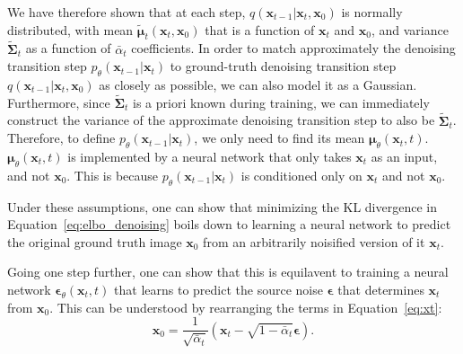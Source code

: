 \documentclass[11pt,addpoints,answers]{exam}
\newcommand{\xv}{\mathbf{x}}
\newcommand{\zv}{\mathbf{z}}
\newcommand{\epsilonv   }{\boldsymbol \epsilon   }
\newcommand{\muv        }{\boldsymbol \mu        }
\begin{document}
\begin{questions}
    We have therefore shown that at each step, 
 $q(\xv_{t-1} | \xv_t, \xv_0)$ is normally distributed, with mean $\tilde{\muv}_t(\xv_t, \xv_0)$
 that is a function of $\xv_t$ and $\xv_0$, and variance $\tilde{\boldsymbol{\Sigma}}_t$ as a function of $\bar\alpha_{t}$ coefficients. In order to match approximately the denoising transition step $p_\theta(\xv_{t-1}|\xv_t)$
 to ground-truth denoising transition step $q(\xv_{t-1} | \xv_t, \xv_0)$
 as closely as possible, we can also model it as a Gaussian. Furthermore, since $\tilde{\boldsymbol{\Sigma}}_t$ is a priori known during training, we can immediately construct the variance of the approximate denoising transition step to also be 
$\tilde{\boldsymbol{\Sigma}}_t$. Therefore, to define $p_\theta(\xv_{t-1}|\xv_t)$, we only need to find its mean $\boldsymbol{\mu}_\theta(\xv_t, t)$. $\boldsymbol{\mu}_\theta(\xv_t, t)$ is implemented by a neural network that only takes $\xv_t$ as an input, and not $\xv_0$. This is because $p_\theta(\xv_{t-1}|\xv_t)$ is conditioned only on $\xv_t$ and not $\xv_0$.
    \par
Under these assumptions, one can show that minimizing the KL divergence in Equation~\ref{eq:elbo_denoising} boils down to learning a neural network to predict the original ground truth image $\xv_0$ from an arbitrarily noisified version of it $\xv_t$. 

Going one step further, one can show that this is equilavent to training a neural network $\boldsymbol{\epsilon}_\theta(\xv_t,t)$ that learns to predict the source noise $\boldsymbol{\epsilon}$
 that determines $\xv_t$
 from $\xv_0$. This can be understood by rearranging the terms in Equation~\ref{eq:xt}: 
\begin{equation}
        \xv_0 = \frac{1}{\sqrt{\bar{\alpha}_t}} \left( \xv_t - \sqrt{1 - \bar{\alpha}_t} \epsilonv \right).
\end{equation}





\end{questions}
\end{document}
